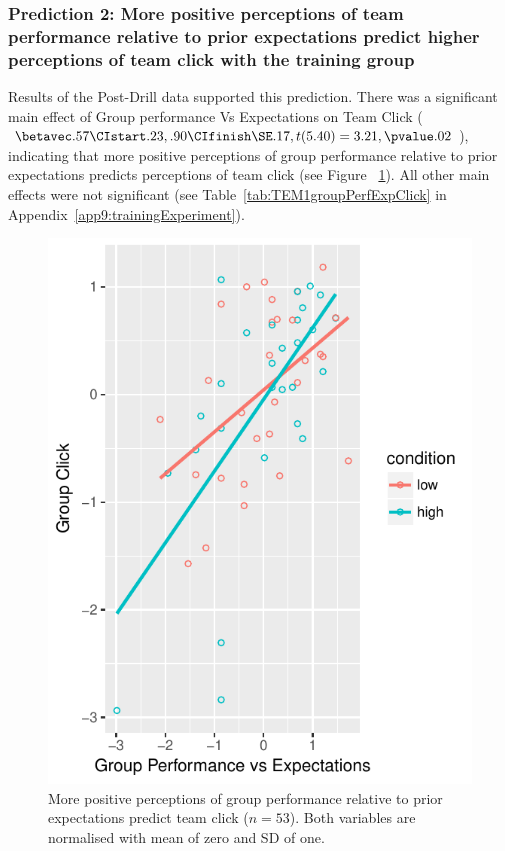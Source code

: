 \subsubsection{Prediction 2: More positive perceptions of team performance relative to prior expectations predict higher perceptions of team click with the training group}

Results of the Post-Drill data supported this prediction. There was a significant main effect of Group performance Vs Expectations on Team Click ($\betavec .57 \CIstart .23, .90 \CIfinish \SE .17, t(5.40) = 3.21, \pvalue .02$), indicating that more positive perceptions of group performance relative to prior expectations predicts perceptions of team click (see Figure ~\ref{fig:teamPerfExpClickScatter}).  All other main effects were not significant (see Table~\ref{tab:TEM1groupPerfExpClick} in Appendix~\ref{app9:trainingExperiment}).


\begin{figure}
    \centering
    \includegraphics[width=0.5\linewidth,keepaspectratio] {images/teamPerfExpClickScatter}
    \caption{More positive perceptions of group performance relative to prior expectations predict team click ($n = 53$).  Both  variables are normalised with mean of zero and SD of one.}
    \label{fig:teamPerfExpClickScatter}
\end{figure}

